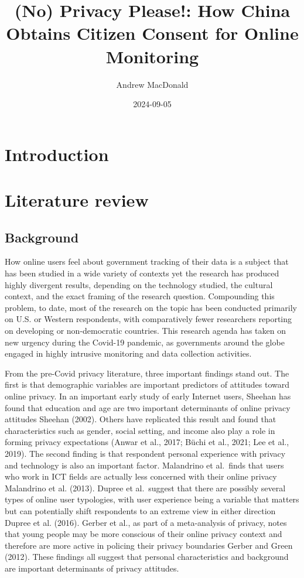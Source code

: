\documentclass[
  letterpaper,
  DIV=11,
  numbers=noendperiod]{scrartcl}
\title{(No) Privacy Please!: How China Obtains Citizen Consent for
Online Monitoring}
\author{Andrew MacDonald}
\date{2024-09-05}
\begin{document}
\maketitle

\section{Introduction}\label{sec-introduction}

\section{Literature review}\label{sec-litreview}

\subsection{Background}\label{background}

How online users feel about government tracking of their data is a
subject that has been studied in a wide variety of contexts yet the
research has produced highly divergent results, depending on the
technology studied, the cultural context, and the exact framing of the
research question. Compounding this problem, to date, most of the
research on the topic has been conducted primarily on U.S. or Western
respondents, with comparatively fewer researchers reporting on
developing or non-democratic countries. This research agenda has taken
on new urgency during the Covid-19 pandemic, as governments around the
globe engaged in highly intrusive monitoring and data collection
activities.

From the pre-Covid privacy literature, three important findings stand
out. The first is that demographic variables are important predictors of
attitudes toward online privacy. In an important early study of early
Internet users, Sheehan has found that education and age are two
important determinants of online privacy attitudes Sheehan (2002).
Others have replicated this result and found that characteristics such
as gender, social setting, and income also play a role in forming
privacy expectations (Anwar et al., 2017; Büchi et al., 2021; Lee et
al., 2019). The second finding is that respondent personal experience
with privacy and technology is also an important factor. Malandrino et
al.~finds that users who work in ICT fields are actually less concerned
with their online privacy Malandrino et al. (2013). Dupree et
al.~suggest that there are possibly several types of online user
typologies, with user experience being a variable that matters but can
potentially shift respondents to an extreme view in either direction
Dupree et al. (2016). Gerber et al., as part of a meta-analysis of
privacy, notes that young people may be more conscious of their online
privacy context and therefore are more active in policing their privacy
boundaries Gerber and Green (2012). These findings all suggest that
personal characteristics and background are important determinants of
privacy attitudes.
\end{document}
